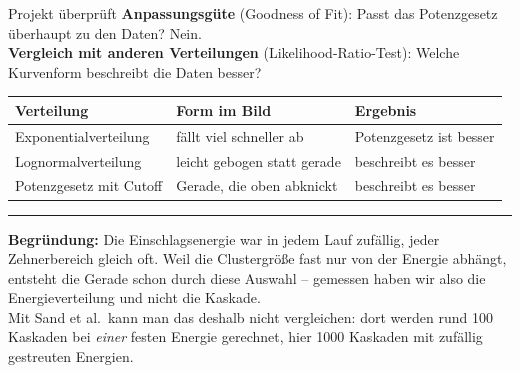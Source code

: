 \documentclass[aspectratio=169,11pt]{beamer}
\begin{document}
\begin{frame}{Projekt überprüft}
  \leavevmode
  {\footnotesize \textbf{Anpassungsgüte} (Goodness of Fit): Passt das
  Potenzgesetz überhaupt zu den Daten? \alert{Nein.}\\[0.5em]
  \textbf{Vergleich mit anderen Verteilungen} (Likelihood-Ratio-Test): Welche
  Kurvenform beschreibt die Daten besser?}\\[0.4em]
  {\scriptsize
  \begin{tabular}{@{}lll@{}}
    \toprule
    Verteilung & Form im Bild & Ergebnis\\
    \midrule
    Exponentialverteilung & fällt viel schneller ab & Potenzgesetz ist besser\\
    Lognormalverteilung & leicht gebogen statt gerade & \alert{beschreibt es besser}\\
    Potenzgesetz mit Cutoff & Gerade, die oben abknickt & \alert{beschreibt es besser}\\
    \bottomrule
  \end{tabular}}
  \vspace{0.7em}\hrule\vspace{0.5em}
  {\footnotesize \alert{\textbf{Begründung:}} Die Einschlagsenergie war in
  jedem Lauf zufällig, jeder Zehnerbereich gleich oft. Weil die Clustergröße
  fast nur von der Energie abhängt, entsteht die Gerade schon durch diese
  Auswahl -- gemessen haben wir also die Energieverteilung und nicht die
  Kaskade.\\[0.3em]
  Mit Sand et al.\ kann man das deshalb nicht vergleichen: dort werden rund
  100 Kaskaden bei \emph{einer} festen Energie gerechnet, hier 1000 Kaskaden
  mit zufällig gestreuten Energien.}
\end{frame}
\end{document}
